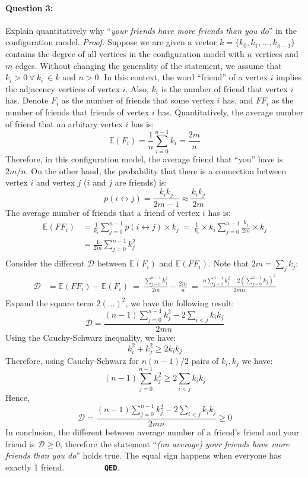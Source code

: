 \documentclass[a4paper,12pt]{article}
\begin{document}
\paragraph{Question 3:} Explain quantitatively why ``\emph{your friends have more friends than you do}'' in the configuration model.
\noindent
\emph{Proof: } Suppose we are given a vector $k = \{k_0, k_1, ..., k_{n-1}\}$ contains the degree of all vertices in the configuration model with $n$ vertices and $m$ edges. Without changing the generality of the statement, we assume that $k_i > 0 \ \forall \ k_i \ \in k$ and $n > 0$. In this context, the word ``friend'' of a vertex $i$ implies the adjacency vertices of vertex $i$. Also, $k_i$ is the number of friend that vertex $i$ has. Denote $F_i$ as the number of friends that some vertex $i$ has, and $FF_i$ as the number of friends that friends of vertex $i$ has. Quantitatively, the average number of friend that an arbitary vertex $i$ has is:
$$ \mathds{E}(F_i) = \frac{1}{n} \sum_{i=0}^{n-1} k_i = \frac{2m}{n} $$
Therefore, in this configuration model, the average friend that ``you'' have is $2m/n$. On the other hand, the probability that there is a connection between vertex $i$ and vertex $j$ ($i$ and $j$ are friends) is:
$$ p(i \leftrightarrow j) = \frac{k_ik_j}{2m - 1} \approx \frac{k_ik_j}{2m} $$
The average number of friends that a friend of vertex $i$ has is:
\begin{equation*}
  \begin{aligned}
\mathds{E}(FF_i) & = \frac{1}{k_i} \sum_{j = 0}^{n-1} p(i \leftrightarrow j) \times k_j
 \ = \ \frac{1}{k_i} \times k_i \sum_{j = 0}^{n-1} \frac{k_j}{2m} \times k_j \\
& = \frac{1}{2m} \sum_{j = 0}^{n-1} k_j^2 \\
  \end{aligned}
\end{equation*}
Consider the different $\mathcal{D}$ between $\mathds{E}(F_i)$ and $\mathds{E}(FF_i)$. Note that $2m = \sum_{j} k_j$:
\begin{equation*}
  \begin{aligned}
    \mathcal{D} & = \mathds{E}(FF_i) - \mathds{E}(F_i)
    \ = \ \frac{\displaystyle\sum_{j = 0}^{n-1} k_j^2}{2m} - \frac{2m}{n}
     \ = \ \frac{n \displaystyle\sum_{j = 0}^{n-1} k_j^2 - 2 \left(\sum_{j = 0}^{n-1} k_j \right)^2 }{2mn} \\
  \end{aligned}
\end{equation*}
Expand the square term $2(...)^2$, we have the following result:
$$\mathcal{D} = \frac{(n-1) \displaystyle\sum_{j = 0}^{n-1} k_j^2 - 2 \sum_{i < j} k_ik_j}{2mn}$$
Using the Cauchy-Schwarz inequality, we have:
$$ k_i^2 + k_j^2 \geq 2k_ik_j $$
Therefore, using Cauchy-Schwarz for $n(n-1)/2$ pairs of $k_i, k_j$ we have:
$$ (n-1) \sum_{j = 0}^{n-1} k_j^2 \geq 2 \sum_{i < j} k_ik_j $$
Hence,
$$\mathcal{D} = \frac{(n-1) \displaystyle\sum_{j = 0}^{n-1} k_j^2 - 2 \sum_{i < j} k_ik_j}{2mn} \geq 0$$
In conclusion, the different between average number of a friend's friend and your friend is $\mathcal{D} \geq 0$, therefore the statement ``\emph{(on average) your friends have more friends than you do}'' holds true. The equal sign happens when everyone has exactly 1 friend. \ \ \ \ \ \ \ \ \ \textbf{\texttt{QED}}.
\end{document}
